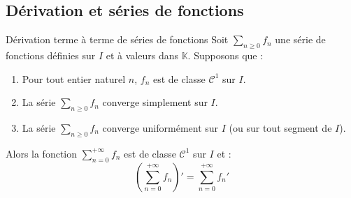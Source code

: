 \documentclass[french,11pt,twoside]{VcCours}
\newcommand{\dt}{\text{d}t}
\begin{document}
\begin{Demonstration}{} 

	\newpage

\vspace*{4cm}
\end{Demonstration}

\subsection{Dérivation et séries de fonctions}

\begin{Theoreme}{Dérivation terme à terme de séries de fonctions}
Soit $\sum_{n \geq 0} f_n$ une série de fonctions définies sur $I$ et à valeurs dans $\mathbb{K}$. Supposons que :

\begin{enumerate}
\item Pour tout entier naturel $n$, $f_n$ est de classe $\mathcal{C}^1$ sur $I$.
\item La série $\sum_{n \geq 0} f_n$ converge simplement sur $I$.
\item La série $\sum_{n \geq 0} f_n$ converge uniformément sur $I$ (ou sur tout segment de $I$).
\end{enumerate}
Alors la fonction $\sum_{n=0}^{+ \infty} f_n$ est de classe $\mathcal{C}^1$ sur $I$ et :
$$ \left( \sum_{n=0}^{+ \infty} f_n \right)' = \sum_{n=0}^{+ \infty} f_n'$$
\end{Theoreme}
\end{document}
